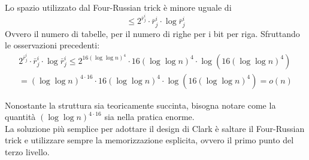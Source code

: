 Lo spazio utilizzato dal Four-Russian trick è minore uguale di
$$\leq 2^{\bar{r}_j^i}\cdot\bar{r}_j^i\cdot\log \bar{r}_j^i$$
Ovvero il numero di tabelle, per il numero di righe per i bit per riga.
Sfruttando le osservazioni precedenti:
\begin{equation}
    \begin{aligned}
        2^{\bar{r}_j^i}\cdot\bar{r}_j^i\cdot\log \bar{r}_j^i
        \leq 2^{16 (\log \log n)^4}\cdot 16(\log \log n)^4 \cdot \log(16(\log \log n)^4)\\
        = (\log \log n)^{4\cdot 16} \cdot 16(\log \log n)^4\cdot \log(16(\log \log n)^4) = o(n)
    \end{aligned}
\end{equation}
\begin{remark}
    Nonostante la struttura sia teoricamente succinta, bisogna notare come 
    la quantità $(\log \log n)^{4\cdot 16}$ sia nella pratica enorme.\\
    La soluzione più semplice per adottare il design di Clark è saltare il 
    Four-Russian trick e utilizzare sempre la memorizzazione esplicita, 
    ovvero il primo punto del terzo livello.
\end{remark}